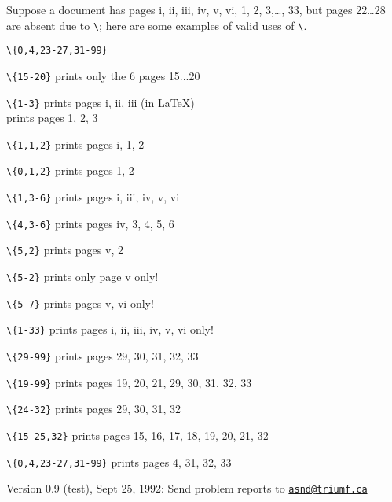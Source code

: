 \documentclass[pagesize=auto, fontsize=12pt]{scrartcl}
\makeatletter
\newcommand*{\mail}[1]{\href{mailto:#1}{\texttt{#1}}}
\newcommand*{\cs}[1]{\texttt{\textbackslash#1}}
\newcommand*{\cmd}[1]{\cs{\expandafter\@gobble\string#1}}
\newcommand*{\outputonly}[1]{\cmd{\outputonly}\texttt{\{#1\}}}
\makeatother
\begin{document}
Suppose a document has pages i, ii, iii, iv, v, vi, 1, 2, 3,\dots, 33, but pages
22\dots28 are absent due to \cmd{}; here are some examples of valid
uses of \cmd{\outputonly}.
%
\begin{labeling}[\enspace\textendash]{\outputonly{0,4,23-27,31-99}}
\item[\outputonly{15-20}]
  prints only the 6 pages 15...20
\item[\outputonly{1-3}]
  prints pages i, ii, iii (in \LaTeX)\\
   prints pages 1, 2, 3
\item[\outputonly{1,1,2}]
  prints pages i, 1, 2
\item[\outputonly{0,1,2}]
  prints pages 1, 2
\item[\outputonly{1,3-6}]
  prints pages i, iii, iv, v, vi
\item[\outputonly{4,3-6}]
  prints pages iv, 3, 4, 5, 6
\item[\outputonly{5,2}]
  prints pages v, 2
\item[\outputonly{5-2}]
  prints only page v    only!
\item[\outputonly{5-7}]
  prints pages v, vi     only!
\item[\outputonly{1-33}]
  prints pages i, ii, iii, iv, v, vi  only!
\item[\outputonly{29-99}]
  prints pages 29, 30, 31, 32, 33
\item[\outputonly{19-99}]
  prints pages 19, 20, 21, 29, 30, 31, 32, 33
\item[\outputonly{24-32}]
  prints pages 29, 30, 31, 32
\item[\outputonly{15-25,32}]
  prints pages 15, 16, 17, 18, 19, 20, 21, 32
\item[\outputonly{0,4,23-27,31-99}]
  prints pages 4, 31, 32, 33
\end{labeling}

Version 0.9 (test), Sept 25, 1992:
Send problem reports to \mail{asnd@triumf.ca}
\end{document}

